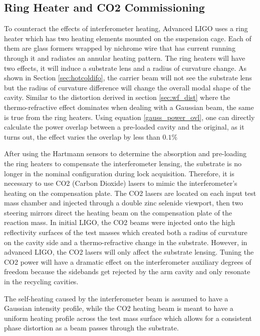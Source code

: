 	\subsection{Ring Heater and CO2 Commissioning}\label{Sec:RH}
	To counteract the effects of interferometer heating, Advanced LIGO uses a ring heater \cite{ramette_analytical} \cite{wang_thermalmodel} which has two heating elements mounted on the suspension cage. Each of them are glass formers wrapped by nichrome wire that has current running through it and radiates an annular heating pattern. The ring heaters will have two effects, it will induce a substrate lens and a radius of curvature change.  As shown in Section \ref{sec:hotcoldifo}, the carrier beam will not see the substrate lens but the radius of curvature difference will change the overall modal shape of the cavity.  Similar to the distortion derived in section \ref{sec:wf_dist} where the thermo-refractive effect dominates when dealing with a Gaussian beam, the same is true from the ring heaters. Using equation \ref{gauss_power_ovl}, one can directly calculate the power overlap between a pre-loaded cavity and the original, as it turns out, the effect varies the overlap by less than $0.1\%$

	After using the Hartmann sensors to determine the absorption and pre-loading the ring heaters to compensate the interferometer lensing, the substrate is no longer in the nominal configuration during lock acquisition.  Therefore, it is necessary to use CO2 (Carbon Dioxide) lasers to mimic the interferometer's heating on the compensation plate.  The CO2 lasers are located on each input test mass chamber and injected through a double zinc selenide viewport, then two steering mirrors direct the heating beam on the compensation plate of the reaction mass.  In initial LIGO, the CO2 beams were injected onto the high reflectivity surfaces of the test masses which created both a radius of curvature on the cavity side and a thermo-refractive change in the substrate.  However, in advanced LIGO, the CO2 lasers will only affect the substrate lensing.  Tuning the CO2 power will have a dramatic effect on the interferometer auxiliary degrees of freedom because the sidebands get rejected by the arm cavity and only resonate in the recycling cavities.
	
	The self-heating caused by the interferometer beam is assumed to have a Gaussian intensity profile, while the CO2 heating beam is meant to have a uniform heating profile across the test mass surface which allows for a consistent phase distortion as a beam passes through the substrate.
	
